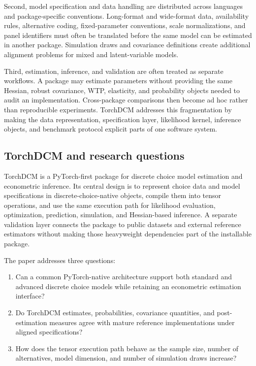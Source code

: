 \documentclass[11pt]{article}
\begin{document}
Second, model specification and data handling are distributed across languages
and package-specific conventions. Long-format and wide-format data, availability
rules, alternative coding, fixed-parameter conventions, scale normalizations,
and panel identifiers must often be translated before the same model can be
estimated in another package. Simulation draws and covariance definitions create
additional alignment problems for mixed and latent-variable models.

Third, estimation, inference, and validation are often treated as separate
workflows. A package may estimate parameters without providing the same
Hessian, robust covariance, WTP, elasticity, and probability objects needed to
audit an implementation. Cross-package comparisons then become ad hoc rather
than reproducible experiments. TorchDCM addresses this fragmentation by making
the data representation, specification layer, likelihood kernel, inference
objects, and benchmark protocol explicit parts of one software system.

\subsection{TorchDCM and research questions}

TorchDCM is a PyTorch-first package for discrete choice model estimation and
econometric inference. Its central design is to represent choice data and model
specifications in discrete-choice-native objects, compile them into tensor
operations, and use the same execution path for likelihood evaluation,
optimization, prediction, simulation, and Hessian-based inference. A separate
validation layer connects the package to public datasets and external reference
estimators without making those heavyweight dependencies part of the installable
package.

The paper addresses three questions:

\begin{enumerate}
    \item Can a common PyTorch-native architecture support both standard and
    advanced discrete choice models while retaining an econometric estimation
    interface?
    \item Do TorchDCM estimates, probabilities, covariance quantities, and
    post-estimation measures agree with mature reference implementations under
    aligned specifications?
    \item How does the tensor execution path behave as the sample size, number
    of alternatives, model dimension, and number of simulation draws increase?
\end{enumerate}
\end{document}
